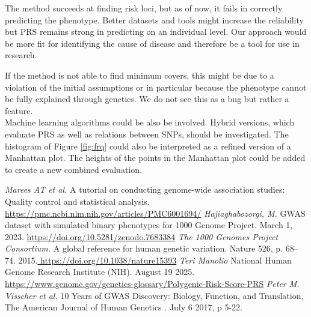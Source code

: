 \documentclass[letterpaper, 11pt]{article}
\begin{document}
The method succeeds at finding risk loci, but as of now, it fails in correctly predicting the phenotype. Better datasets and tools might increase the reliability but PRS remains strong in predicting on an individual level. Our approach would be more fit for identifying the cause of disease and therefore be a tool for use in research. 

If the method is not able to find minimum covers, this might be due to a violation of the initial assumptions or in particular because the phenotype cannot be fully explained through genetics. We do not see this as a bug but rather a feature.\\

Machine learning algorithms could be also be involved. Hybrid versions, which evaluate PRS as well as relations between SNPs, should be investigated. The histogram of Figure \ref{fig:frq} could also be interpreted as a refined version of a Manhattan plot. The heights of the points in the Manhattan plot could be added to create a new combined evaluation. 


\newpage
\begin{thebibliography}{99}
\emph{Marees AT et al. } A tutorial on conducting genome-wide association studies: Quality control and statistical analysis. \url{https://pmc.ncbi.nlm.nih.gov/articles/PMC6001694/}
\emph{Hajiaghabozorgi, M. } GWAS dataset with simulated binary phenotypes for 1000 Genome Project. March 1, 2023. \url{https://doi.org/10.5281/zenodo.7683384}
\emph{The 1000 Genomes Project Consortium.} A global reference for human genetic variation. Nature 526, p. 68–74. 2015.\url{ https://doi.org/10.1038/nature15393}
\emph{Teri Manolio} National Human Genome Research Institute (NIH). August 19 2025. \url{https://www.genome.gov/genetics-glossary/Polygenic-Risk-Score-PRS}
\emph{Peter M. Visscher et al. } 10 Years of GWAS Discovery: Biology, Function, and Translation, The American Journal of Human Genetics . July 6 2017, p 5-22. 
\end{thebibliography}
\end{document}
